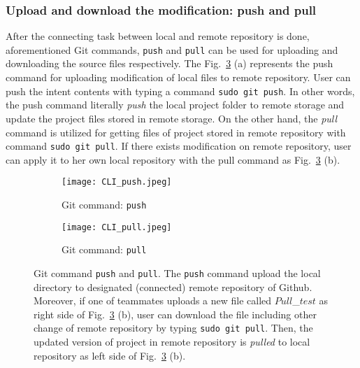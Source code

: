 \documentclass{article}
\begin{document}
\subsubsection{Upload and download the modification: push and pull}
\hspace*{2mm}After the connecting task between local and remote repository is done, aforementioned Git commands, \texttt{push} and \texttt{pull} can be used for uploading and downloading the source files respectively. The Fig.~\ref{fig:CLI_push_pull} (a) represents the push command for uploading modification of local files to remote repository. User can push the intent contents with typing a command \texttt{sudo git push}. In other words, the push command literally \textit{push} the local project folder to remote storage and update the project files stored in remote storage. On the other hand, the \textit{pull} command is utilized for getting files of project stored in remote repository with command \texttt{sudo git pull}. If there exists modification on remote repository, user can apply it to her own local repository with the pull command as Fig.~\ref{fig:CLI_push_pull} (b).

\begin{figure}[h]
        \centering
        \begin{subfigure}[b]{0.475\textwidth}
            \centering
            \texttt{[image: CLI\_push.jpeg]}
            \caption[Network2]%
            {{\small Git command: \texttt{push}}}    
            \label{fig:mean and std of net14}
        \end{subfigure}
        \hfill
        \begin{subfigure}[b]{0.475\textwidth}  
            \centering 
            \texttt{[image: CLI\_pull.jpeg]}
             \caption[Network2]%
            {{\small Git command: \texttt{pull}}}    
            \label{fig:mean and std of net24}
        \end{subfigure}
        \caption[Network2]%
        {\small Git command \texttt{push} and \texttt{pull}. The \texttt{push} command upload the local directory to designated (connected) remote repository of Github. Moreover, if one of teammates uploads a new file called $Pull$\_$test$ as right side of Fig.~\ref{fig:CLI_push_pull} (b), user can download the file including other change of remote repository by typing \texttt{sudo git pull}. Then, the updated version of project in remote repository is \textit{pulled} to local repository as left side of Fig.~\ref{fig:CLI_push_pull} (b).} 
        \label{fig:CLI_push_pull}
\end{figure}
 
\end{document}
